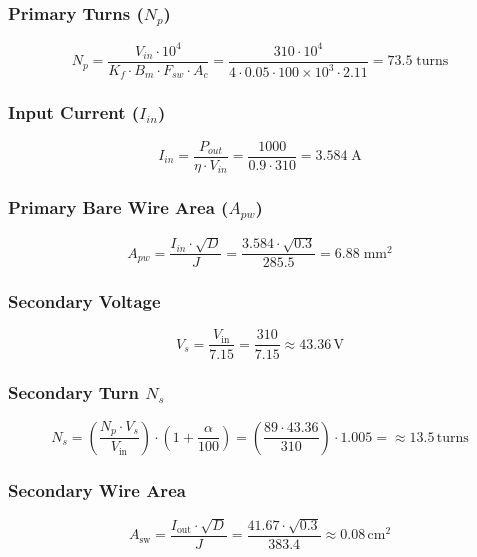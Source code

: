 \subsubsection*{Primary Turns (\(N_p\))}
\begin{equation}
N_p = \frac{V_{in} \cdot 10^4}{K_f \cdot B_m \cdot F_{sw} \cdot A_c} 
    = \frac{310 \cdot 10^4}{4 \cdot 0.05 \cdot 100 \times 10^3 \cdot 2.11} 
    = \boxed{73.5\;\text{turns}}
\end{equation}

\subsubsection*{Input Current (\(I_{in}\))}
\begin{equation}
I_{in} = \frac{P_{out}}{\eta \cdot V_{in}} 
       = \frac{1000}{0.9 \cdot 310} 
       = \boxed{3.584\;\text{A}}
\end{equation}

\subsubsection*{Primary Bare Wire Area (\(A_{pw}\))}
\begin{equation}
A_{pw} = \frac{I_{in} \cdot \sqrt{D}}{J} 
       = \frac{3.584 \cdot \sqrt{0.3}}{285.5} 
       = \boxed{6.88\;\text{mm}^2}
\end{equation}

\subsubsection*{Secondary Voltage}
\begin{equation}
    V_s = \frac{V_{\text{in}}}{7.15} = \frac{310}{7.15} \approx \boxed{43.36\,\text{V}}
\end{equation}

\subsubsection*{Secondary  Turn \( N_s\)}
\begin{equation}
    N_s = \left( \frac{N_p \cdot V_s}{V_{\text{in}}} \right) \cdot \left( 1 + \frac{\alpha}{100} \right) = \left( \frac{89 \cdot 43.36}{310} \right) \cdot 1.005 = \approx \boxed{13.5\,\text{turns}}
\end{equation}

\subsubsection*{Secondary Wire Area}
\begin{equation}
A_{\text{sw}} = \frac{I_{\text{out}} \cdot \sqrt{D}}{J} 
= \frac{41.67 \cdot \sqrt{0.3}}{383.4}
\approx \boxed{0.08\,\text{cm}^2}
\end{equation}


